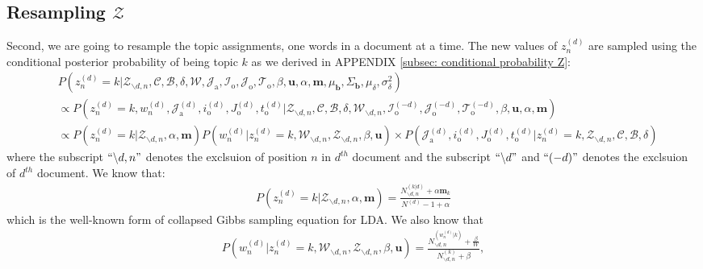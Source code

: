 \documentclass[a4paper]{article}
\begin{document}
     \subsection{Resampling $\mathcal{Z}$}  \label{subsec: Resampling Z}
Second, we are going to resample the topic assignments, one words in a document at a time.  The new values of $z^{(d)}_n$ are sampled using the conditional posterior probability of being topic $k$ as we derived in APPENDIX \ref{subsec: conditional probability Z}:
 \begin{equation}
 \begin{aligned} & 
 P(z^{(d)}_n=k|\mathcal{Z}_{\backslash d, n},   \mathcal{C},   \mathcal{B}, \delta, \mathcal{W},  \mathcal{J}_{\mbox{a}}, \mathcal{I}_{\mbox{o}}, \mathcal{J}_{\mbox{o}}, \mathcal{T}_{\mbox{o}}, \beta, \boldsymbol{u}, \alpha, \boldsymbol{m},  \mu_{\boldsymbol{b}}, \Sigma_{\boldsymbol{b}}, \mu_\delta, \sigma^2_\delta)\\
 & \propto P(z^{(d)}_n=k, w^{(d)}_n, \mathcal{J}^{(d)}_{\mbox{a}}, i^{(d)}_{\mbox{o}}, J^{(d)}_{\mbox{o}}, t^{(d)}_{\mbox{o}}|\mathcal{Z}_{\backslash d, n}, \mathcal{C},   \mathcal{B},\delta,\mathcal{W}_{\backslash d, n}, \mathcal{I}^{(-d)}_{\mbox{o}}, \mathcal{J}^{(-d)}_{\mbox{o}}, \mathcal{T}^{(-d)}_{\mbox{o}}, \beta, \boldsymbol{u}, \alpha, \boldsymbol{m})\\
 &\propto P(z^{(d)}_n=k|\mathcal{Z}_{\backslash d, n}, \alpha, \boldsymbol{m})P(w^{(d)}_n|z^{(d)}_n=k, \mathcal{W}_{\backslash d, n}, \mathcal{Z}_{\backslash d, n}, \beta, \boldsymbol{u} )\times P(\mathcal{J}^{(d)}_{\mbox{a}}, i^{(d)}_{\mbox{o}}, J^{(d)}_{\mbox{o}}, t^{(d)}_{\mbox{o}}| z^{(d)}_n=k, \mathcal{Z}_{\backslash d, n}, \mathcal{C}, \mathcal{B}, \delta)
 \end{aligned}
 \end{equation}
 where the subscript $``{\backslash d, n}"$ denotes the exclsuion of position $n$ in $d^{th}$ document and the subscript $``{\backslash d}"$ and $``{(-d)}"$ denotes the exclsuion of $d^{th}$ document. We know that:
 \begin{equation}
 \begin{aligned} 
 P(z^{(d)}_n=k|\mathcal{Z}_{\backslash d, n}, \alpha, \boldsymbol{m})=\frac{N^{(k|d)}_{\backslash d, n}+\alpha \boldsymbol{m}_k}{N^{(d)}-1+\alpha}
 \end{aligned}
 \end{equation}
 which is the well-known form of collapsed Gibbs sampling equation for LDA. We also know that \begin{equation}
 \begin{aligned} 
 P(w^{(d)}_n|z^{(d)}_n=k, \mathcal{W}_{\backslash d, n}, \mathcal{Z}_{\backslash d, n}, \beta, \boldsymbol{u} )=\frac{N^{(w_n^{(d)}|k)}_{\backslash d, n}+\frac{\beta}{W} }{N^{(k)}_{\backslash d, n}+\beta},
 \end{aligned}
 \end{equation}
\end{document}
